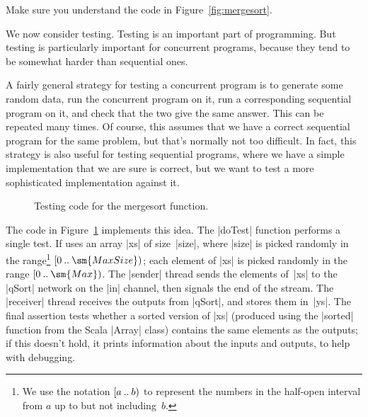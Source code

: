 \begin{instruction}
Make sure you understand the code in Figure~\ref{fig:mergesort}.
\end{instruction}


We now consider testing.  Testing is an important part of
programming.  But testing is particularly important for concurrent programs,
because they tend to be somewhat harder than sequential ones.

A fairly general strategy for testing a concurrent program is to generate some
random data, run the concurrent program on it, run a corresponding sequential
program on it, and check that the two give the same answer.  This can be
repeated many times.  Of course, this assumes that we have a correct
sequential program for the same problem, but that's normally not too
difficult.  In fact, this strategy is also useful for testing sequential
programs, where we have a simple implementation that we are sure is correct,
but we want to test a more sophisticated implementation against it.

\begin{figure}
\caption{Testing code for the {\scalashape mergesort} function.}
\label{fig:mergesort-test}
\end{figure}

The code in Figure~\ref{fig:mergesort-test} implements this idea.  The
|doTest| function performs a single test.  If uses an array |xs| of
size~|size|, where |size| is picked randomly in the range\footnote{We use the
  notation $[a \mathbin{..} b)$ to represent the numbers in the half-open
  interval from $a$ up to but not including~$b$.}
$\interval{0}{\sm{MaxSize}}$; each element of |xs| is picked randomly in the
range $\interval{0}{\sm{Max}}$.  The |sender| thread sends the elements
of~|xs| to the |qSort| network on the |in| channel, then signals the end of
the stream.  The |receiver| thread receives the outputs from |qSort|, and
stores them in~|ys|.  The final assertion tests whether a sorted version of
|xs| (produced using the |sorted| function from the Scala |Array| class)
contains the same elements as the outputs; if this doesn't hold, it prints
information about the inputs and outputs, to help with debugging.

